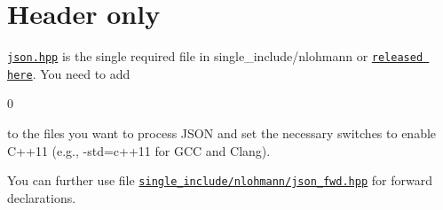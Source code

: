 \chapter{Header only }
\hypertarget{md_include_2nlohman_2json-develop_2docs_2mkdocs_2docs_2integration_2index}{}\label{md_include_2nlohman_2json-develop_2docs_2mkdocs_2docs_2integration_2index}
\label{md_include_2nlohman_2json-develop_2docs_2mkdocs_2docs_2integration_2index_autotoc_md1825}%
%


\href{https://github.com/nlohmann/json/blob/develop/single_include/nlohmann/json.hpp}{\texttt{{\ttfamily json.\+hpp}}} is the single required file in {\ttfamily single\+\_\+include/\+nlohmann} or \href{https://github.com/nlohmann/json/releases}{\texttt{released here}}. You need to add


\begin{DoxyCode}{0}
\DoxyCodeLine{\textcolor{preprocessor}{\#include\ <nlohmann/json.hpp>}}
\DoxyCodeLine{}
\DoxyCodeLine{\textcolor{comment}{//\ for\ convenience}}

\end{DoxyCode}


to the files you want to process JSON and set the necessary switches to enable C++11 (e.\+g., {\ttfamily -\/std=c++11} for GCC and Clang).

You can further use file \href{https://github.com/nlohmann/json/blob/develop/single_include/nlohmann/json_fwd.hpp}{\texttt{{\ttfamily single\+\_\+include/\+nlohmann/\+json\+\_\+fwd.\+hpp}}} for forward declarations. 